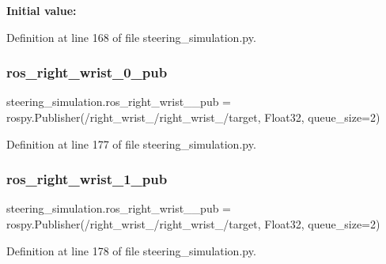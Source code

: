 {\bfseries Initial value\+:}
\begin{DoxyCode}{0}

\end{DoxyCode}


Definition at line 168 of file steering\+\_\+simulation.\+py.

\mbox{\label{namespacesteering__simulation_a8e0b19adafe885231a487bf8378b0fa3}} 
\subsubsection{\texorpdfstring{ros\_right\_wrist\_0\_pub}{ros\_right\_wrist\_0\_pub}}
{\footnotesize\ttfamily steering\+\_\+simulation.\+ros\+\_\+right\+\_\+wrist\+\_\+\_\+pub = rospy.\+Publisher(\textquotesingle{}/right\+\_\+wrist\+\_/right\+\_\+wrist\+\_/target\textquotesingle{}, Float32, queue\+\_\+size=2)}



Definition at line 177 of file steering\+\_\+simulation.\+py.

\mbox{\label{namespacesteering__simulation_a7650fabdc834af9527c1add7de4e3c7e}} 
\subsubsection{\texorpdfstring{ros\_right\_wrist\_1\_pub}{ros\_right\_wrist\_1\_pub}}
{\footnotesize\ttfamily steering\+\_\+simulation.\+ros\+\_\+right\+\_\+wrist\+\_\+\_\+pub = rospy.\+Publisher(\textquotesingle{}/right\+\_\+wrist\+\_/right\+\_\+wrist\+\_/target\textquotesingle{}, Float32, queue\+\_\+size=2)}



Definition at line 178 of file steering\+\_\+simulation.\+py.

